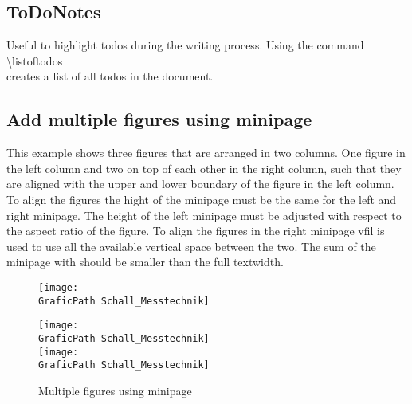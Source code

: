  \subsection{ToDoNotes}
 Useful to highlight todos during the writing process.
 Using the command \\
 \textbackslash listoftodos
 \\
 creates a list of all todos in the document.
 \\
 \subsection{Add multiple figures using minipage}
 This example shows three figures that are arranged in two columns.
 One figure in the left column and two on top of each other in the right column, such that they are aligned with the upper and lower boundary of the figure in the left column.
 To align the figures the hight of the minipage must be the same for the left and right minipage.
 The height of the left minipage must be adjusted with respect to the aspect ratio of the figure.
 To align the figures in the right minipage vfil is used to use all the available vertical space between the two.
 The sum of the minipage with should be smaller than the full textwidth.
 \begin{figure}[htb]
 	\centering
 	\begin{minipage}[c][0.525\textwidth][c]{0.70\textwidth} 	%
 		\texttt{[image: \\GraficPath Schall\_Messtechnik]}
 	\end{minipage}
 	\hfil%
 	\begin{minipage}[c][0.525\textwidth][c]{0.25\textwidth}  %
 		\texttt{[image: \\GraficPath Schall\_Messtechnik]}%
 		\\
 		\vfill
 		\texttt{[image: \\GraficPath Schall\_Messtechnik]}
 	\end{minipage}
 	\caption[Kurztitel]{Multiple figures using minipage}
 	\label{fig:ArtificialSourceOneFoot}
 \end{figure}
